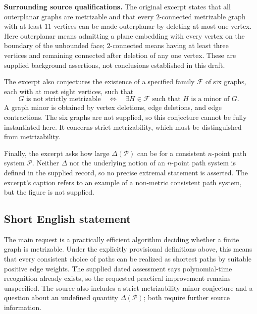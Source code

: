\documentclass[11pt]{article}
\begin{document}
\textbf{Surrounding source qualifications.} The original excerpt states that all outerplanar graphs are metrizable and that every \(2\)-connected metrizable graph with at least \(11\) vertices can be made outerplanar by deleting at most one vertex. Here outerplanar means admitting a plane embedding with every vertex on the boundary of the unbounded face; \(2\)-connected means having at least three vertices and remaining connected after deletion of any one vertex. These are supplied background assertions, not conclusions established in this draft.

The excerpt also conjectures the existence of a specified family \(\mathcal F\) of six graphs, each with at most eight vertices, such that
\[
G\text{ is not strictly metrizable}
\quad\Longleftrightarrow\quad
\exists H\in\mathcal F\text{ such that }H\text{ is a minor of }G.
\]
A graph minor is obtained by vertex deletions, edge deletions, and edge contractions. The six graphs are not supplied, so this conjecture cannot be fully instantiated here. It concerns strict metrizability, which must be distinguished from metrizability.

Finally, the excerpt asks how large \(\Delta(\mathcal P)\) can be for a consistent \(n\)-point path system \(\mathcal P\). Neither \(\Delta\) nor the underlying notion of an \(n\)-point path system is defined in the supplied record, so no precise extremal statement is asserted. The excerpt's caption refers to an example of a non-metric consistent path system, but the figure is not supplied.
\subsection{Short English statement}
The main request is a practically efficient algorithm deciding whether a finite graph is metrizable. Under the explicitly provisional definitions above, this means that every consistent choice of paths can be realized as shortest paths by suitable positive edge weights. The supplied dated assessment says polynomial-time recognition already exists, so the requested practical improvement remains unspecified. The source also includes a strict-metrizability minor conjecture and a question about an undefined quantity \(\Delta(\mathcal P)\); both require further source information.
\end{document}
